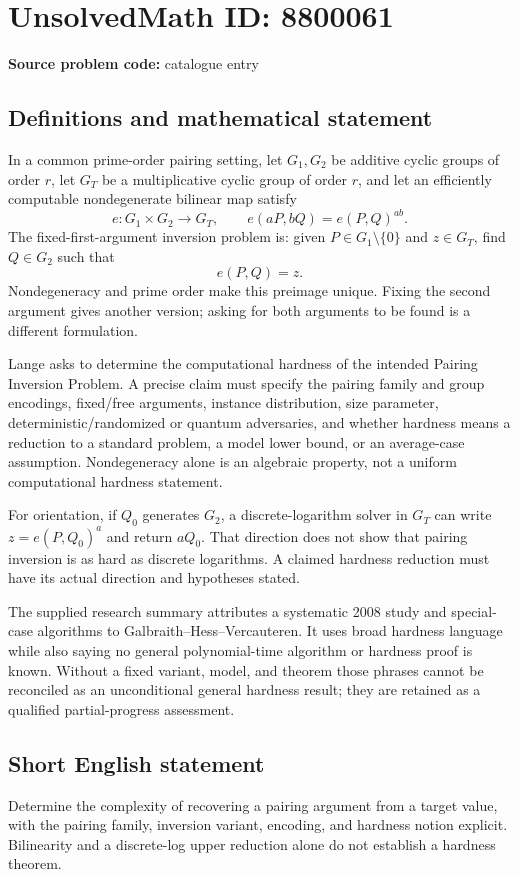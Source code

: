 \documentclass[11pt]{article}
\begin{document}
\section*{UnsolvedMath ID: 8800061}
\textbf{Source problem code:} catalogue entry
\subsection{Definitions and mathematical statement}
In a common prime-order pairing setting, let \(G_1,G_2\) be additive cyclic groups of order \(r\), let \(G_T\) be a multiplicative cyclic group of order \(r\), and let an efficiently computable nondegenerate bilinear map satisfy
\[
e:G_1\times G_2\to G_T,\qquad
 e(aP,bQ)=e(P,Q)^{ab}.
\]
The fixed-first-argument inversion problem is: given \(P\in G_1\setminus\{0\}\) and \(z\in G_T\), find \(Q\in G_2\) such that
\[
e(P,Q)=z.
\]
Nondegeneracy and prime order make this preimage unique. Fixing the second argument gives another version; asking for both arguments to be found is a different formulation.

Lange asks to determine the computational hardness of the intended Pairing Inversion Problem. A precise claim must specify the pairing family and group encodings, fixed/free arguments, instance distribution, size parameter, deterministic/randomized or quantum adversaries, and whether hardness means a reduction to a standard problem, a model lower bound, or an average-case assumption. Nondegeneracy alone is an algebraic property, not a uniform computational hardness statement.

For orientation, if \(Q_0\) generates \(G_2\), a discrete-logarithm solver in \(G_T\) can write \(z=e(P,Q_0)^a\) and return \(aQ_0\). That direction does not show that pairing inversion is as hard as discrete logarithms. A claimed hardness reduction must have its actual direction and hypotheses stated.

The supplied research summary attributes a systematic 2008 study and special-case algorithms to Galbraith--Hess--Vercauteren. It uses broad hardness language while also saying no general polynomial-time algorithm or hardness proof is known. Without a fixed variant, model, and theorem those phrases cannot be reconciled as an unconditional general hardness result; they are retained as a qualified partial-progress assessment.
\subsection{Short English statement}
Determine the complexity of recovering a pairing argument from a target value, with the pairing family, inversion variant, encoding, and hardness notion explicit. Bilinearity and a discrete-log upper reduction alone do not establish a hardness theorem.
\end{document}
